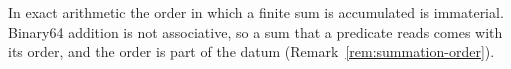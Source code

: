 
In exact arithmetic the order in which a finite sum is accumulated is
immaterial. Binary64 addition is not associative, so a sum that a predicate
reads comes with its order, and the order is part of the datum
(Remark~\ref{rem:summation-order}).

